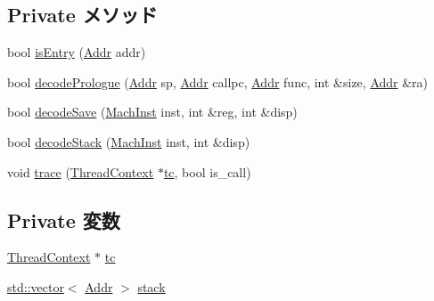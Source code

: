 \subsection*{Private メソッド}
\begin{DoxyCompactItemize}
\item 
bool \hyperlink{classAlphaISA_1_1StackTrace_a8c9787d05f9c0e82dfcaf31cf0fd4b50}{isEntry} (\hyperlink{classm5_1_1params_1_1Addr}{Addr} addr)
\item 
bool \hyperlink{classAlphaISA_1_1StackTrace_a875eea16b2891accc8cbec7eb6c36003}{decodePrologue} (\hyperlink{classm5_1_1params_1_1Addr}{Addr} sp, \hyperlink{classm5_1_1params_1_1Addr}{Addr} callpc, \hyperlink{classm5_1_1params_1_1Addr}{Addr} func, int \&size, \hyperlink{classm5_1_1params_1_1Addr}{Addr} \&ra)
\item 
bool \hyperlink{classAlphaISA_1_1StackTrace_ae56dad5982b67d8717714c383b6a59f8}{decodeSave} (\hyperlink{namespaceAlphaISA_a301c22ea09fa33dcfe6ddf22f203699c}{MachInst} inst, int \&reg, int \&disp)
\item 
bool \hyperlink{classAlphaISA_1_1StackTrace_a61ba7618f77dc6e62d7b0baf6273130c}{decodeStack} (\hyperlink{namespaceAlphaISA_a301c22ea09fa33dcfe6ddf22f203699c}{MachInst} inst, int \&disp)
\item 
void \hyperlink{classAlphaISA_1_1StackTrace_a46d6b95a2e5fdb75702cf45e39566645}{trace} (\hyperlink{classThreadContext}{ThreadContext} $\ast$\hyperlink{classAlphaISA_1_1StackTrace_a4455a4759e69e5ebe68ae7298cbcc37d}{tc}, bool is\_\-call)
\end{DoxyCompactItemize}
\subsection*{Private 変数}
\begin{DoxyCompactItemize}
\item 
\hyperlink{classThreadContext}{ThreadContext} $\ast$ \hyperlink{classAlphaISA_1_1StackTrace_a4455a4759e69e5ebe68ae7298cbcc37d}{tc}
\item 
\hyperlink{classstd_1_1vector}{std::vector}$<$ \hyperlink{classm5_1_1params_1_1Addr}{Addr} $>$ \hyperlink{classAlphaISA_1_1StackTrace_a8be39169db4f31c77f5188de23c602f1}{stack}
\end{DoxyCompactItemize}


